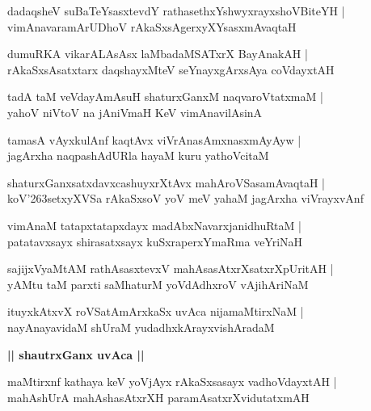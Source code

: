 \documentclass[twoside,12pt,openright]{book}
\def\S{\char'263}
\newcounter{shloka}[chapter]
\def\uvaca#1{\centerline{{\large\textbf{#1}}}}
\begin{document}
\begin{shloka}%
dadaqsheV suBaTeYsasxtevdY rathasethxYshwyxrayxshoVBiteYH |\\
vimAnavaramArUDhoV rAkaSxsAgerxyXYsasxmAvaqtaH 
\end{shloka}

\begin{shloka}%
dumuRKA vikarALAsAsx laMbadaMSATxrX BayAnakAH |\\
rAkaSxsAsatxtarx daqshayxMteV seYnayxgArxsAya coVdayxtAH 
\end{shloka}

\begin{shloka}%
tadA taM veVdayAmAsuH shaturxGanxM naqvaroVtatxmaM |\\
yahoV niVtoV na jAniVmaH KeV vimAnavilAsinA 
\end{shloka}

\begin{shloka}%
tamasA vAyxkulAnf kaqtAvx viVrAnasAmxnasxmAyAyw |\\
jagArxha naqpashAdURla hayaM kuru yathoVcitaM 
\end{shloka}

\begin{shloka}%
shaturxGanxsatxdavxcashuyxrXtAvx mahAroVSasamAvaqtaH |\\
koV\S setxyXVSa rAkaSxsoV yoV meV yahaM jagArxha viVrayxvAnf 
\end{shloka}

\begin{shloka}%
vimAnaM tatapxtatapxdayx madAbxNavarxjanidhuRtaM |\\
patatavxsayx shirasatxsayx kuSxraperxYmaRma veYriNaH 
\end{shloka}

\begin{shloka}%
sajijxVyaMtAM rathAsasxtevxV mahAsasAtxrXsatxrXpUritAH |\\
yAMtu taM parxti saMhaturM yoVdAdhxroV vAjihAriNaM 
\end{shloka}

\begin{shloka}%
ituyxkAtxvX roVSatAmArxkaSx uvAca nijamaMtirxNaM |\\
nayAnayavidaM shUraM yudadhxkArayxvishAradaM 
\end{shloka}

\uvaca{|| shautrxGanx uvAca ||}

\begin{shloka}%
maMtirxnf kathaya keV yoVjAyx rAkaSxsasayx vadhoVdayxtAH |\\
mahAshUrA mahAshasAtxrXH paramAsatxrXvidutatxmAH 
\end{shloka}
\end{document}
